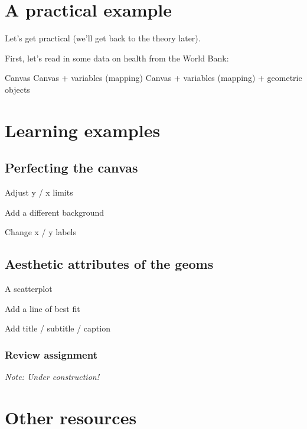 \documentclass[
]{book}
\begin{document}
\hypertarget{a-practical-example}{%
\section*{A practical example}\label{a-practical-example}}

Let's get practical (we'll get back to the theory later).

First, let's read in some data on health from the World Bank:

Canvas
Canvas + variables (mapping)
Canvas + variables (mapping) + geometric objects

\hypertarget{learning-examples}{%
\section*{Learning examples}\label{learning-examples}}

\hypertarget{perfecting-the-canvas}{%
\subsection*{Perfecting the canvas}\label{perfecting-the-canvas}}

Adjust y / x limits

Add a different background

Change x / y labels

\hypertarget{aesthetic-attributes-of-the-geoms}{%
\subsection*{Aesthetic attributes of the geoms}\label{aesthetic-attributes-of-the-geoms}}

A scatterplot

Add a line of best fit

Add title / subtitle / caption

\hypertarget{review-assignment-6}{%
\subsubsection*{Review assignment}\label{review-assignment-6}}

\emph{Note: Under construction!}

\hypertarget{other-resources-3}{%
\section*{Other resources}\label{other-resources-3}}
\end{document}
